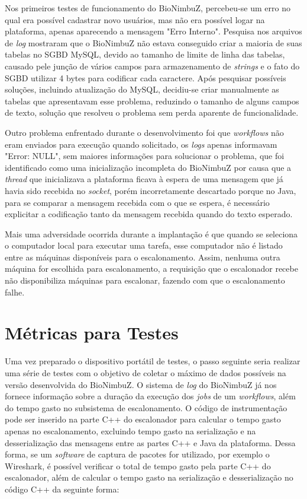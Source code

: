 Nos primeiros testes de funcionamento do BioNimbuZ, percebeu-se um erro no qual era possível cadastrar novo usuários, mas não era possível logar na plataforma, apenas aparecendo a mensagem "Erro Interno". Pesquisa nos arquivos de \textit{log} mostraram que o BioNimbuZ não estava conseguido criar a maioria de suas tabelas no \acrfull{SGBD} MySQL, devido ao tamanho de limite de linha das tabelas, causado pele junção de vários campos para armazenamento de \textit{strings} e o fato do \acrshort{SGBD} utilizar 4 bytes para codificar cada caractere. Após pesquisar possíveis soluções, incluindo atualização do MySQL, decidiu-se criar manualmente as tabelas que apresentavam esse problema, reduzindo o tamanho de alguns campos de texto, solução que resolveu o problema sem perda aparente de funcionalidade.

Outro problema enfrentado durante o desenvolvimento foi que \textit{workflows} não eram enviados para execução quando solicitado, os \textit{logs} apenas informavam "Error: NULL", sem maiores informações para solucionar o problema, que foi identificado como uma inicialização incompleta do BioNimbuZ por causa que a \textit{thread} que inicializava a plataforma ficava à espera de uma mensagem que já havia sido recebida no \textit{socket}, porém incorretamente descartado porque no Java, para se comparar a mensagem recebida com o que se espera, é necessário explicitar a codificação tanto da mensagem recebida quando do texto esperado.

Mais uma adversidade ocorrida durante a implantação é que quando se seleciona o computador local para executar uma tarefa, esse computador não é listado entre as máquinas disponíveis para o escalonamento. Assim, nenhuma outra máquina for escolhida para escalonamento, a requisição que o escalonador recebe não disponibiliza máquinas para escalonar, fazendo com que o escalonamento falhe.

\section{Métricas para Testes}

Uma vez preparado o dispositivo portátil de testes, o passo seguinte seria realizar uma série de testes com o objetivo de coletar o máximo de dados possíveis na versão desenvolvida do BioNimbuZ. O sistema de \textit{log} do BioNimbuZ já nos fornece informação sobre a duração da execução dos \textit{jobs} de um \textit{workflows}, além do tempo gasto no subsistema de escalonamento. O código de instrumentação pode ser inserido na parte C++ do escalonador para calcular o tempo gasto apenas no escalonamento, excluindo tempo gasto na serialização e na desserialização das mensagens entre as partes C++ e Java da plataforma. Dessa forma, se um \textit{software} de captura de pacotes for utilizado, por exemplo o Wireshark\cite{Wireshark}, é possível verificar o total de tempo gasto pela parte C++ do escalonador, além de calcular o tempo gasto na serialização e desserialização no código C++ da seguinte forma:


